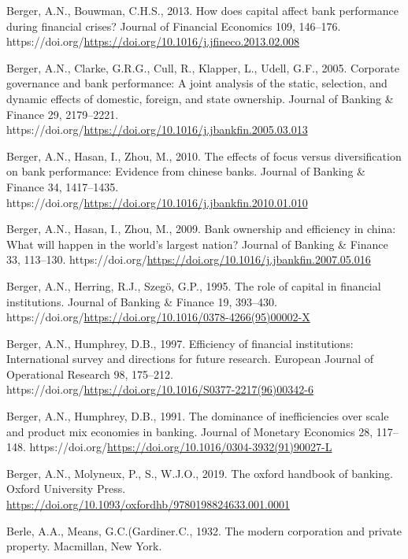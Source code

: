 \documentclass[
  12pt,
  a4paper,
]{scrreprt}
\newlength{\cslhangindent}
\newenvironment{CSLReferences}[2] %
 {\begin{list}{}{%
  \setlength{\itemindent}{0pt}
  \setlength{\leftmargin}{0pt}
  \setlength{\parsep}{0pt}
  \ifodd #1
   \setlength{\leftmargin}{\cslhangindent}
   \setlength{\itemindent}{-1\cslhangindent}
  \fi
  \setlength{\itemsep}{#2\baselineskip}}}
 {\end{list}}
\begin{document}
\begin{CSLReferences}{1}{0}
Berger, A.N., Bouwman, C.H.S., 2013. How does capital affect bank
performance during financial crises? Journal of Financial Economics 109,
146--176.
https://doi.org/\url{https://doi.org/10.1016/j.jfineco.2013.02.008}

Berger, A.N., Clarke, G.R.G., Cull, R., Klapper, L., Udell, G.F., 2005.
Corporate governance and bank performance: A joint analysis of the
static, selection, and dynamic effects of domestic, foreign, and state
ownership. Journal of Banking \& Finance 29, 2179--2221.
https://doi.org/\url{https://doi.org/10.1016/j.jbankfin.2005.03.013}

Berger, A.N., Hasan, I., Zhou, M., 2010. The effects of focus versus
diversification on bank performance: Evidence from chinese banks.
Journal of Banking \& Finance 34, 1417--1435.
https://doi.org/\url{https://doi.org/10.1016/j.jbankfin.2010.01.010}

Berger, A.N., Hasan, I., Zhou, M., 2009. Bank ownership and efficiency
in china: What will happen in the world's largest nation? Journal of
Banking \& Finance 33, 113--130.
https://doi.org/\url{https://doi.org/10.1016/j.jbankfin.2007.05.016}

Berger, A.N., Herring, R.J., Szegö, G.P., 1995. The role of capital in
financial institutions. Journal of Banking \& Finance 19, 393--430.
https://doi.org/\url{https://doi.org/10.1016/0378-4266(95)00002-X}

Berger, A.N., Humphrey, D.B., 1997. Efficiency of financial
institutions: International survey and directions for future research.
European Journal of Operational Research 98, 175--212.
https://doi.org/\url{https://doi.org/10.1016/S0377-2217(96)00342-6}

Berger, A.N., Humphrey, D.B., 1991. The dominance of inefficiencies over
scale and product mix economies in banking. Journal of Monetary
Economics 28, 117--148.
https://doi.org/\url{https://doi.org/10.1016/0304-3932(91)90027-L}

Berger, A.N., Molyneux, P., S., W.J.O., 2019. The oxford handbook of
banking. Oxford University Press.
\url{https://doi.org/10.1093/oxfordhb/9780198824633.001.0001}

Berle, A.A., Means, G.C.(Gardiner.C., 1932. The modern corporation and
private property. Macmillan, New York.


\end{CSLReferences}
\end{document}
